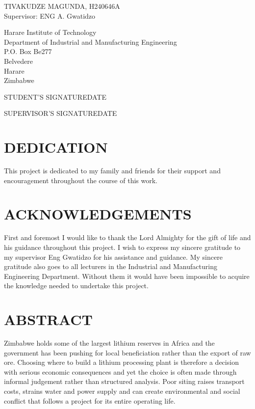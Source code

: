 \documentclass[12pt,a4paper]{report}
\begin{document}
\vspace{18pt}
TIVAKUDZE MAGUNDA, H240646A\\
Supervisor: ENG A. Gwatidzo

\vspace{18pt}
Harare Institute of Technology\\
Department of Industrial and Manufacturing Engineering\\
P.O. Box Be277\\
Belvedere\\
Harare\\
Zimbabwe

\vspace{24pt}
STUDENT'S SIGNATURE\dotfill DATE\dotfill

SUPERVISOR'S SIGNATURE\dotfill DATE\dotfill

\chapter*{DEDICATION}
This project is dedicated to my family and friends for their support
and encouragement throughout the course of this work.

\chapter*{ACKNOWLEDGEMENTS}
First and foremost I would like to thank the Lord Almighty for the gift
of life and his guidance throughout this project. I wish to express my
sincere gratitude to my supervisor Eng Gwatidzo for his assistance and
guidance. My sincere gratitude also goes to all lecturers in the
Industrial and Manufacturing Engineering Department. Without them it
would have been impossible to acquire the knowledge needed to undertake
this project.

\chapter*{ABSTRACT}
Zimbabwe holds some of the largest lithium reserves in Africa and the
government has been pushing for local beneficiation rather than the
export of raw ore. Choosing where to build a lithium processing plant is
therefore a decision with serious economic consequences and yet the
choice is often made through informal judgement rather than structured
analysis. Poor siting raises transport costs, strains water and power
supply and can create environmental and social conflict that follows a
project for its entire operating life.
\end{document}
